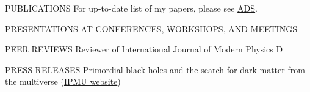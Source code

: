 \documentclass{resume} %
\begin{document}
\clearpage
\begin{rSection}{PUBLICATIONS}
    For up-to-date list of my papers, please see \href{https://ui.adsabs.harvard.edu/search/filter_author_facet_hier_fq_author=AND&filter_author_facet_hier_fq_author=author_facet_hier%3A%221%2FSugiyama%2C%20S%2FSugiyama%2C%20Sunao%22&fq=%7B!type%3Daqp%20v%3D%24fq_author%7D&fq_author=(author_facet_hier%3A%221%2FSugiyama%2C%20S%2FSugiyama%2C%20Sunao%22)&q=pubdate%3A%5B2001-01%20TO%209999-12%5D%20author%3A(%22Sugiyama%2CSunao%22)&sort=date%20desc%2C%20bibcode%20desc&p_=0}{ADS}.
    \vspace{-19em}
    
    
\end{rSection}

\begin{rSection}{PRESENTATIONS AT CONFERENCES, WORKSHOPS, AND MEETINGS}
    
\end{rSection}

\begin{rSection}{PEER REVIEWS}
    Reviewer of International Journal of Modern Physics D
\end{rSection}

\begin{rSection}{PRESS RELEASES}
    Primordial black holes and the search for dark matter from the multiverse (\href{https://www.ipmu.jp/en/20201224-PBH-multiverse}{IPMU website})
\end{rSection}
\end{document}
